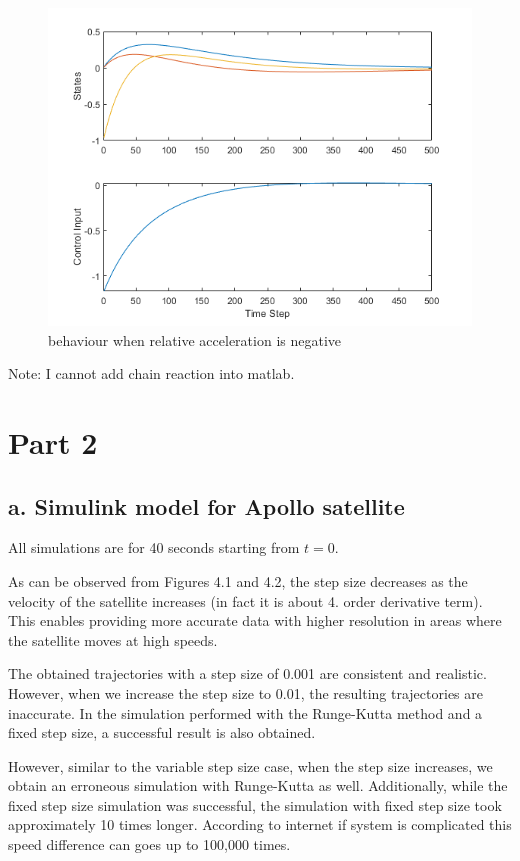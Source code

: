 \documentclass[12pt]{report}
\begin{document}
\begin{figure}
    \centering
    \includegraphics[width = 0.8 \textwidth]{decelereted.png}
    \caption{behaviour when relative acceleration is negative}
\end{figure}

Note: I cannot add chain reaction into matlab.


\chapter{Part 2}


\section{a. Simulink model for Apollo satellite}

All simulations are for 40 seconds starting from $t = 0$.


As can be observed from Figures 4.1 and 4.2, the step size decreases as the velocity of the satellite increases (in fact it is about 4. order derivative term). This enables providing more accurate data with higher resolution in areas where the satellite moves at high speeds. 

The obtained trajectories with a step size of 0.001 are consistent and realistic. However, when we increase the step size to 0.01, the resulting trajectories are inaccurate. In the simulation performed with the Runge-Kutta method and a fixed step size, a successful result is also obtained. 

However, similar to the variable step size case, when the step size increases, we obtain an erroneous simulation with Runge-Kutta as well. Additionally, while the fixed step size simulation was successful, the simulation with fixed step size took approximately 10 times longer. According to internet if system is complicated this speed difference can goes up to 100,000 times. 
\end{document}
